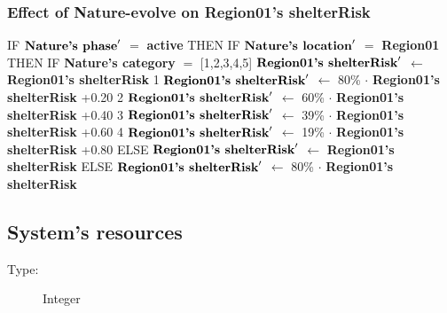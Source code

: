 \documentclass{article}%
\begin{document}
\subsubsection{Effect of Nature{-}evolve on Region01's shelterRisk}%
\label{ssubsec:Effect of Nature{-}evolve on Region01's shelterRisk}%
\begin{flushleft}%
IF %
$\mbox{\textbf{Nature's phase}} '$%
$=$%
\textbf{active}%
\linebreak%
\hspace*{2em}%
THEN %
IF %
$\mbox{\textbf{Nature's location}} '$%
$=$%
\textbf{Region01}%
\linebreak%
\hspace*{4em}%
THEN %
IF %
\textbf{Nature's category}%
$=$%
{[}1,2,3,4,5{]}%
\linebreak%
\hspace*{6em}%
$\mbox{\textbf{Region01's shelterRisk}} '$%
$\leftarrow$%
\textbf{Region01's shelterRisk}%
\linebreak%
\hspace*{6em}%
1 %
$\mbox{\textbf{Region01's shelterRisk}} '$%
$\leftarrow$%
80\%%
$\cdot$%
\textbf{Region01's shelterRisk}%
+0.20%
\linebreak%
\hspace*{6em}%
2 %
$\mbox{\textbf{Region01's shelterRisk}} '$%
$\leftarrow$%
60\%%
$\cdot$%
\textbf{Region01's shelterRisk}%
+0.40%
\linebreak%
\hspace*{6em}%
3 %
$\mbox{\textbf{Region01's shelterRisk}} '$%
$\leftarrow$%
39\%%
$\cdot$%
\textbf{Region01's shelterRisk}%
+0.60%
\linebreak%
\hspace*{6em}%
4 %
$\mbox{\textbf{Region01's shelterRisk}} '$%
$\leftarrow$%
19\%%
$\cdot$%
\textbf{Region01's shelterRisk}%
+0.80%
\linebreak%
\hspace*{4em}%
ELSE %
$\mbox{\textbf{Region01's shelterRisk}} '$%
$\leftarrow$%
\textbf{Region01's shelterRisk}%
\linebreak%
\hspace*{2em}%
ELSE %
$\mbox{\textbf{Region01's shelterRisk}} '$%
$\leftarrow$%
80\%%
$\cdot$%
\textbf{Region01's shelterRisk}%
\end{flushleft}

%
\subsection{System's resources}%
\label{subsec:System's resources}%
\begin{description}%
\item[Type:]%
Integer%
\end{description}%
\end{document}
